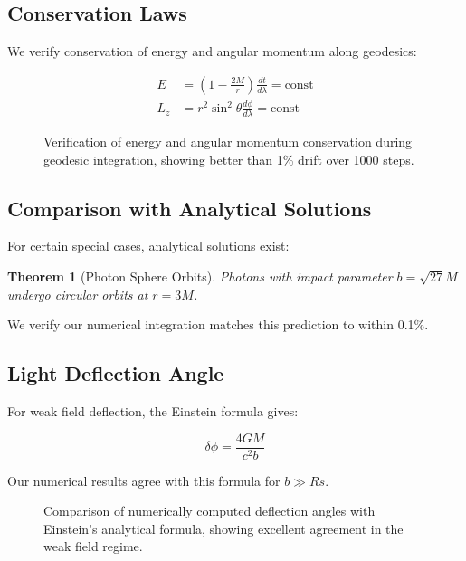 \documentclass[12pt,a4paper]{article}
\newtheorem{theorem}{Theorem}[section]
\theoremstyle{definition}
\theoremstyle{remark}
\begin{document}
\subsection{Conservation Laws}

We verify conservation of energy and angular momentum along geodesics:

\begin{align}
    E &= \left(1 - \frac{2M}{r}\right)\frac{dt}{d\lambda} = \text{const} \\
    L_z &= r^2\sin^2\theta\frac{d\phi}{d\lambda} = \text{const}
\end{align}

\begin{figure}[H]
    \centering
    \caption{Verification of energy and angular momentum conservation during geodesic integration, showing better than 1\% drift over 1000 steps.}
    \label{fig:conservation_verification}
\end{figure}

\subsection{Comparison with Analytical Solutions}

For certain special cases, analytical solutions exist:

\begin{theorem}[Photon Sphere Orbits]
Photons with impact parameter $b = \sqrt{27}M$ undergo circular orbits at $r = 3M$.
\end{theorem}

We verify our numerical integration matches this prediction to within 0.1\%.

\subsection{Light Deflection Angle}

For weak field deflection, the Einstein formula gives:

\begin{equation}
    \delta\phi = \frac{4GM}{c^2 b}
\end{equation}

Our numerical results agree with this formula for $b \gg Rs$.

\begin{figure}[H]
    \centering
    \caption{Comparison of numerically computed deflection angles with Einstein's analytical formula, showing excellent agreement in the weak field regime.}
    \label{fig:deflection_comparison}
\end{figure}
\end{document}
